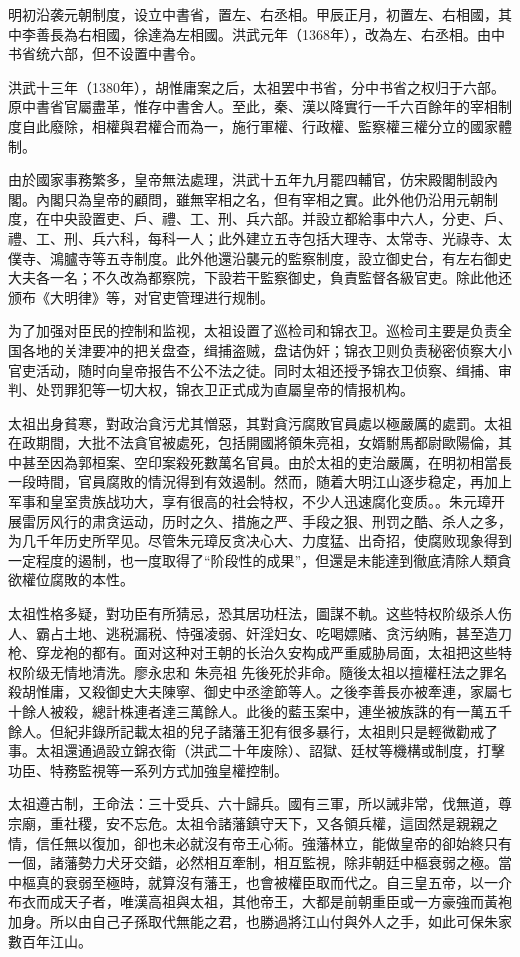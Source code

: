 明初沿袭元朝制度，设立中書省，置左、右丞相。甲辰正月，初置左、右相國，其中李善長為右相國，徐達為左相國。洪武元年（1368年），改為左、右丞相。由中书省统六部，但不设置中書令。

洪武十三年（1380年），胡惟庸案之后，太祖罢中书省，分中书省之权归于六部。原中書省官屬盡革，惟存中書舍人。至此，秦、漢以降實行一千六百餘年的宰相制度自此廢除，相權與君權合而為一，施行軍權、行政權、監察權三權分立的國家體制。

由於國家事務繁多，皇帝無法處理，洪武十五年九月罷四輔官，仿宋殿閣制設內閣。內閣只為皇帝的顧問，雖無宰相之名，但有宰相之實。此外他仍沿用元朝制度，在中央設置吏、戶、禮、工、刑、兵六部。并設立都給事中六人，分吏、戶、禮、工、刑、兵六科，每科一人；此外建立五寺包括大理寺、太常寺、光祿寺、太僕寺、鴻臚寺等五寺制度。此外他還沿襲元的監察制度，設立御史台，有左右御史大夫各一名；不久改為都察院，下設若干監察御史，負責監督各級官吏。除此他还颁布《大明律》等，对官吏管理进行规制。

为了加强对臣民的控制和监视，太祖设置了巡检司和锦衣卫。巡检司主要是负责全国各地的关津要冲的把关盘查，缉捕盗贼，盘诘伪奸；锦衣卫则负责秘密侦察大小官吏活动，随时向皇帝报告不公不法之徒。同时太祖还授予锦衣卫侦察、缉捕、审判、处罚罪犯等一切大权，锦衣卫正式成为直屬皇帝的情报机构。

太祖出身貧寒，對政治貪污尤其憎惡，其對貪污腐敗官員處以極嚴厲的處罰。太祖在政期間，大批不法貪官被處死，包括開國將領朱亮祖，女婿駙馬都尉歐陽倫，其中甚至因為郭桓案、空印案殺死數萬名官員。由於太祖的吏治嚴厲，在明初相當長一段時間，官員腐敗的情況得到有效遏制。然而，随着大明江山逐步稳定，再加上军事和皇室贵族战功大，享有很高的社会特权，不少人迅速腐化变质。。朱元璋开展雷厉风行的肃贪运动，历时之久、措施之严、手段之狠、刑罚之酷、杀人之多，为几千年历史所罕见。尽管朱元璋反贪决心大、力度猛、出奇招，使腐败现象得到一定程度的遏制，也一度取得了“阶段性的成果”，但還是未能達到徹底清除人類貪欲權位腐敗的本性。

太祖性格多疑，對功臣有所猜忌，恐其居功枉法，圖謀不軌。这些特权阶级杀人伤人、霸占土地、逃税漏税、恃强凌弱、奸淫妇女、吃喝嫖赌、贪污纳贿，甚至造刀枪、穿龙袍的都有。面对这种对王朝的长治久安构成严重威胁局面，太祖把这些特权阶级无情地清洗。廖永忠和 朱亮祖 先後死於非命。隨後太祖以擅權枉法之罪名殺胡惟庸，又殺御史大夫陳寧、御史中丞塗節等人。之後李善長亦被牽連，家屬七十餘人被殺，總計株連者達三萬餘人。此後的藍玉案中，連坐被族誅的有一萬五千餘人。但紀非錄所記載太祖的兒子諸藩王犯有很多暴行，太祖則只是輕微勸戒了事。太祖還通過設立錦衣衛（洪武二十年废除）、詔獄、廷杖等機構或制度，打擊功臣、特務監視等一系列方式加強皇權控制。

太祖遵古制，王命法：三十受兵、六十歸兵。國有三軍，所以誡非常，伐無道，尊宗廟，重社稷，安不忘危。太祖令諸藩鎮守天下，又各領兵權，這固然是親親之情，信任無以復加，卻也未必就沒有帝王心術。強藩林立，能做皇帝的卻始終只有一個，諸藩勢力犬牙交錯，必然相互牽制，相互監視，除非朝廷中樞衰弱之極。當中樞真的衰弱至極時，就算沒有藩王，也會被權臣取而代之。自三皇五帝，以一介布衣而成天子者，唯漢高祖與太祖，其他帝王，大都是前朝重臣或一方豪強而黃袍加身。所以由自己子孫取代無能之君，也勝過將江山付與外人之手，如此可保朱家數百年江山。

